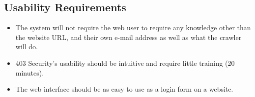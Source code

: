 \subsection{Usability Requirements}
\begin{itemize}
    \item The system will not require the web user to require any knowledge other than the website URL, and their own e-mail address as well as what the crawler will do.
    \item 403 Security's usability should be intuitive and require little training (20 minutes).
    \item The web interface should be as easy to use as a login form on a website.

\end{itemize}
